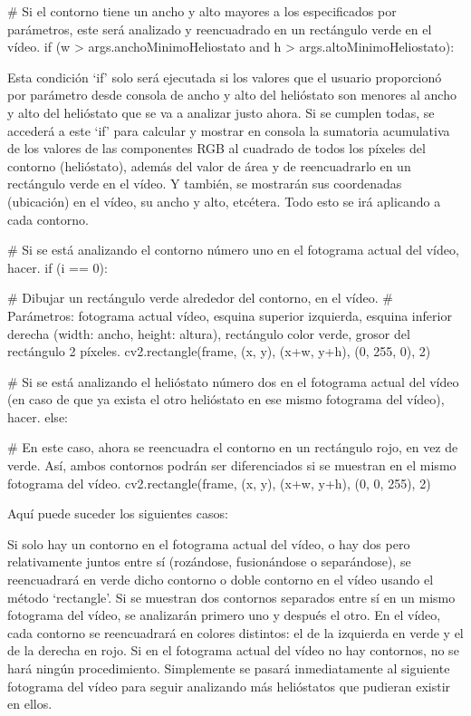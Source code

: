         \# Si el contorno tiene un ancho y alto mayores a los especificados por parámetros, este será analizado y reencuadrado en un rectángulo verde en el vídeo.
        if (w > args.anchoMinimoHeliostato and h > args.altoMinimoHeliostato):

Esta condición ‘if’ solo será ejecutada si los valores que el usuario proporcionó por parámetro desde consola de ancho y alto del helióstato son menores al ancho y alto del helióstato que se va a analizar justo ahora. Si se cumplen todas, se accederá a este ‘if’ para calcular y mostrar en consola la sumatoria acumulativa de los valores de las componentes RGB al cuadrado de todos los píxeles del contorno (helióstato), además del valor de área y de reencuadrarlo en un rectángulo verde en el vídeo. Y también, se mostrarán sus coordenadas (ubicación) en el vídeo, su ancho y alto, etcétera. Todo esto se irá aplicando a cada contorno.
            

            \# Si se está analizando el contorno número uno en el fotograma actual del vídeo, hacer.
            if (i == 0):

                \# Dibujar un rectángulo verde alrededor del contorno, en el vídeo.
                \# Parámetros: fotograma actual vídeo, esquina superior izquierda, esquina inferior derecha (width: ancho, height: altura), rectángulo color verde, grosor del rectángulo 2 píxeles.
                cv2.rectangle(frame, (x, y), (x+w, y+h), (0, 255, 0), 2)

            \# Si se está analizando el helióstato número dos en el fotograma actual del vídeo (en caso de que ya exista el otro helióstato en ese mismo fotograma del vídeo), hacer.
            else:

                \# En este caso, ahora se reencuadra el contorno en un rectángulo rojo, en vez de verde. Así, ambos contornos podrán ser diferenciados si se muestran en el mismo fotograma del vídeo.
                cv2.rectangle(frame, (x, y), (x+w, y+h), (0, 0, 255), 2)

Aquí puede suceder los siguientes casos:

Si solo hay un contorno en el fotograma actual del vídeo, o hay dos pero relativamente juntos entre sí (rozándose, fusionándose o separándose), se reencuadrará en verde dicho contorno o doble contorno en el vídeo usando el método ‘rectangle’.
Si se muestran dos contornos separados entre sí en un mismo fotograma del vídeo, se analizarán primero uno y después el otro. En el vídeo, cada contorno se reencuadrará en colores distintos: el de la izquierda en verde y el de la derecha en rojo.
Si en el fotograma actual del vídeo no hay contornos, no se hará ningún procedimiento. Simplemente se pasará inmediatamente al siguiente fotograma del vídeo para seguir analizando más helióstatos que pudieran existir en ellos.


